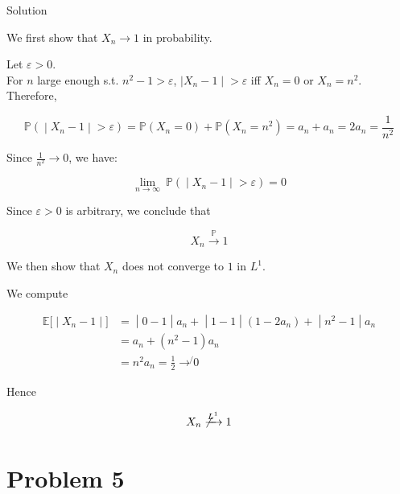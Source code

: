\begin{qlsolution}{Solution}

We first show that \(\mathit{X}_{\mathit{n}}\rightarrow 1\) in probability.

Let \(\mathit{\varepsilon} > 0\).\\
For \(\mathit{n}\) large enough s.t. \(\mathit{n}^{2} - 1 > \mathit{\varepsilon}\), \(\left. |\mathit{X}_{\mathit{n}} - 1 \middle| > \mathit{\varepsilon} \right.\) iff \(\mathit{X}_{\mathit{n}} = 0\) or \(\mathit{X}_{\mathit{n}} = \mathit{n}^{2}\). Therefore,

\[\left. \mathbb{P}( \middle| \mathit{X}_{\mathit{n}} - 1 \middle| > \mathit{\varepsilon}) = \mathbb{P}(\mathit{X}_{\mathit{n}} = 0) + \mathbb{P}(\mathit{X}_{\mathit{n}} = \mathit{n}^{2}) = \mathit{a}_{\mathit{n}} + \mathit{a}_{\mathit{n}} = 2\mathit{a}_{\mathit{n}} = \frac{1}{\mathit{n}^{2}} \right.\]

Since \(\frac{1}{\mathit{n}^{2}}\rightarrow 0\), we have:

\[\left. \lim\limits_{\mathit{n}\rightarrow\infty}\ \mathbb{P}( \middle| \mathit{X}_{\mathit{n}} - 1 \middle| > \mathit{\varepsilon}) = 0 \right.\]

Since \(\mathit{\varepsilon} > 0\) is arbitrary, we conclude that

\[\mathit{X}_{\mathit{n}}\overset{\mathbb{P}}{\rightarrow}1\]

We then show that \(\mathit{X}_{\mathit{n}}\) does not converge to \(1\) in \(\mathit{L}^{1}\).

We compute

\[\begin{matrix}
\left. \mathbb{E}\lbrack \middle| \mathit{X}_{\mathit{n}} - 1 \middle| \rbrack \right. & \left. = \middle| 0 - 1 \middle| \mathit{a}_{\mathit{n}} + \middle| 1 - 1 \middle| (1 - 2\mathit{a}_{\mathit{n}}) + \middle| \mathit{n}^{2} - 1 \middle| \mathit{a}_{\mathit{n}} \right. \\
 & {= \mathit{a}_{\mathit{n}} + (\mathit{n}^{2} - 1)\mathit{a}_{\mathit{n}}} \\
 & {= \mathit{n}^{2}\mathit{a}_{\mathit{n}} = \frac{1}{2}\operatorname{\rightarrow\not{}}0}
\end{matrix}\]

Hence

\[X_n \not\xrightarrow{L^1} 1\]

\end{qlsolution}

\section{Problem 5}\label{hw04-problem-5}

